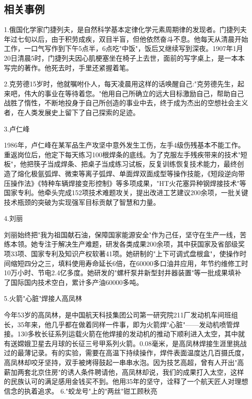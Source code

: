 \documentclass[UTF8]{ctexart}
\begin{document}
\subsection{相关事例}
1.俄国化学家门捷列夫，是自然科学基本定律化学元素周期律的发现者。门捷列夫年过七旬以后，由于积劳成疾，双目半盲，但他依然奋斗不息。他每天从清晨开始工作，一口气写作到下午5点半，6点吃"中饭"，饭后又继续写到深夜。1907年1月20日清晨5时，门捷列夫因心肌梗塞坐在椅子上去世，面前的写字桌上，是一本本写完的著作。他死去时，手里还紧握着笔。\par
2.克劳德15岁时，他就嘱咐仆人，每天凌晨用这样的话唤醒自己:"克劳德先生，起来吧，伟大的事业在等待着您。"他用自己所确立的远大目标激励自己，帮助自己战胜了惰性，不断地投身于自己所创造的事业中去，终于成为杰出的空想社会主义者，在人类发展史上留下了自己探索的足迹。\par
3.卢仁峰\par
1986年，卢仁峰在某军品生产攻坚中意外发生工伤，左手4级伤残基本不能工作。重返岗位后，他定下每天练习100根焊条的底线。为了克服左手残疾带来的技术"短板"，他把筷子当成焊条、把桌子当成练习试板，反复训练恢复技术能力，最终创造了熔化极氩弧焊、微束等离子弧焊、单面焊双面成型等操作技能，《短段逆向带压操作法》《特种车辆焊接变形控制》等多项成果，"HT火花塞异种钢焊接技术"等国家专利。他牵头完成152项技术难题攻关，提出改进工艺建议200余项，一批关键技术瓶颈的突破为实现强军目标贡献了智慧和力量。\par
4.刘丽\par
刘丽始终把"我为祖国献石油，保障国家能源安全"作为己任，坚守在生产一线，苦练本领。她专注于解决生产难题，研发各类成果200余项，其中获国家及省部级奖项33项、国家专利及知识产权软著41项。她研制的"上下可调式盘根盒"，使操作时间缩短四分之三，填料使用寿命延长6倍，在60000多口油井应用，年节约维修工时10万小时、节电2.4亿多度。她研发的"螺杆泵井新型封井器装置"等一批成果填补了国际国内技术空白，累计多产油60000多吨。\par
5.火箭"心脏"焊接人高凤林\par
今年53岁的高凤林，是中国航天科技集团公司第一研究院211厂发动机车间班组长，35年来，他几乎都在做着同样一件事，即为火箭焊"心脏"——发动机喷管焊接。130多枚长征系列运载火箭在他焊接的发动机的推动下顺利进入太空，其中就有送嫦娥卫星去月球的长征三号甲系列火箭。0.08毫米，是高凤林焊接生涯里挑战过的最薄记录。有的实验，需要在高温下持续操作，焊件表面温度达几百摄氏度，高凤林却咬牙坚持，双手被烤得鼓起一串串水泡。因为技艺高超，曾有人开出"高薪加两套北京住房"的诱人条件聘请他，高凤林却说，我们的成果打入太空，这样的民族认可的满足感用金钱买不到。他用35年的坚守，诠释了一个航天匠人对理想信念的执着追求。
6."蛟龙号"上的"两丝"钳工顾秋亮\par
\end{document}
